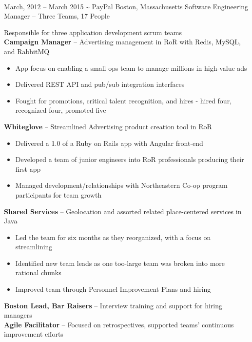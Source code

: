 \documentclass[]{friggeri-cv}
\begin{document}
\begin{entrylist}
  \\[1cm]%
  \entryalt
    {March, 2012 -- March 2015}
    {\textbf{\textasciitilde} PayPal}
    {Boston, Massachusetts}
    {Software Engineering Manager -- Three Teams, 17 People}
    {Responsible for three application development scrum teams \\
      \textbf{Campaign Manager} -- Advertising management in RoR with Redis, MySQL,
      and RabbitMQ
    \begin{itemize}
      \item App focus on enabling a small ops team to manage millions in
        high-value ads
      \item Delivered REST API and pub/sub integration interfaces
      \item Fought for promotions, critical talent recognition, and hires - hired four, recognized four, promoted five
    \end{itemize}
      \textbf{Whiteglove} -- Streamlined Advertising product creation tool in RoR
    \begin{itemize}
      \item Delivered a 1.0 of a Ruby on Rails app with Angular front-end
      \item Developed a team of junior engineers into RoR professionals producing their first app
      \item Managed development/relationships with Northeastern Co-op program
        participants for team growth
    \end{itemize} 
      \textbf{Shared Services} -- Geolocation and assorted related place-centered
      services in Java
    \begin{itemize}
      \item Led the team for six months as they reorganized, with a focus on
        streamlining
      \item Identified new team leads as one too-large team was broken
        into more rational chunks
      \item Improved team through Personnel Improvement Plans and hiring
    \end{itemize}
    \textbf{Boston Lead, Bar Raisers} -- Interview training and support for hiring managers\\
    \textbf{Agile Facilitator} -- Focused on retrospectives, supported teams' continuous improvement efforts}


\end{entrylist}
\end{document}
